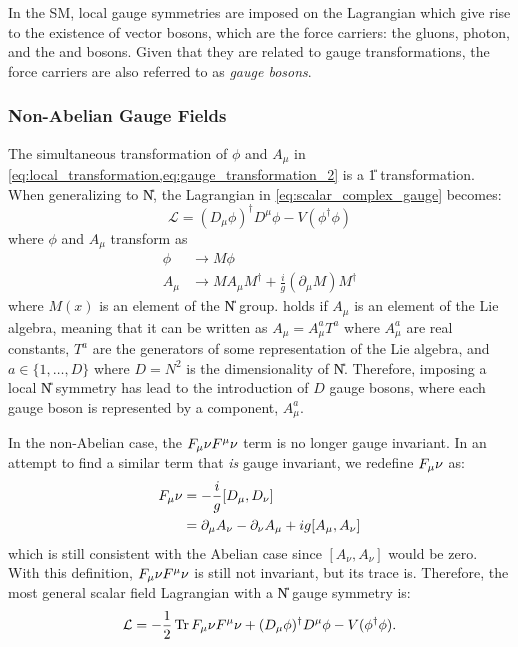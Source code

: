 In the SM, local gauge symmetries are imposed on the Lagrangian which give rise to the existence of vector bosons, which are the force carriers: the gluons, photon, and the \PWpm and \PZ bosons. Given that they are related to gauge transformations, the force carriers are also referred to as \textit{gauge bosons}.

\subsubsection{Non-Abelian Gauge Fields}
The simultaneous transformation of $\phi$ and $A_\mu$ in \cref{eq:local_transformation,eq:gauge_transformation_2} is a \U{1} transformation. When generalizing to \U{N}, the Lagrangian in \cref{eq:scalar_complex_gauge} becomes:
\begin{equation}
  \mathcal{L} = (D_\mu\phi)^\dag D^\mu \phi - V(\phi^\dag\phi)
\end{equation}
where $\phi$ and $A_\mu$ transform as
\begin{align}
  \phi &\to M \phi \\
  A_\mu &\to M A_\mu M^\dag + \frac{i}{g}(\partial_\mu M)M^\dag \label{eq:non_abelian_vector_transformation}
\end{align}
where $M(x)$ is an element of the \U{N} group.  holds if $A_\mu$ is an element of the Lie algebra, meaning that it can be written as $A_\mu = A_\mu^a T^a$ where $A_\mu^a$ are real constants, $T^a$ are the generators of some representation of the Lie algebra, and $a \in \{1,\ldots,D\}$ where $D=N^2$ is the dimensionality of \U{N}. Therefore, imposing a local \U{N} symmetry has lead to the introduction of $D$ gauge bosons, where each gauge boson is represented by a component, $A_\mu^a$. 

In the non-Abelian case, the $F_\mu\nu F^\mu\nu$ term is no longer gauge invariant. In an attempt to find a similar term that \textit{is} gauge invariant, we redefine $F_\mu\nu$ as:
\begin{align}
  F_\mu\nu &= -\frac{i}{g} [D_\mu, D_\nu] \\
  &= \partial_\mu A_\nu - \partial_\nu A_\mu + ig[A_\mu, A_\nu]
\end{align}
which is still consistent with the Abelian case since $[A_\nu, A_\nu]$ would be zero. With this definition, $F_\mu\nu F^\mu\nu$ is still not invariant, but its trace is. Therefore, the most general scalar field Lagrangian with a \U{N} gauge symmetry is:
\begin{equation}
  \mathcal{L} = -\frac{1}{2} \operatorname{Tr} F_\mu\nu F^\mu\nu + (D_\mu\phi)^\dag D^\mu \phi - V(\phi^\dag\phi).
\end{equation}

